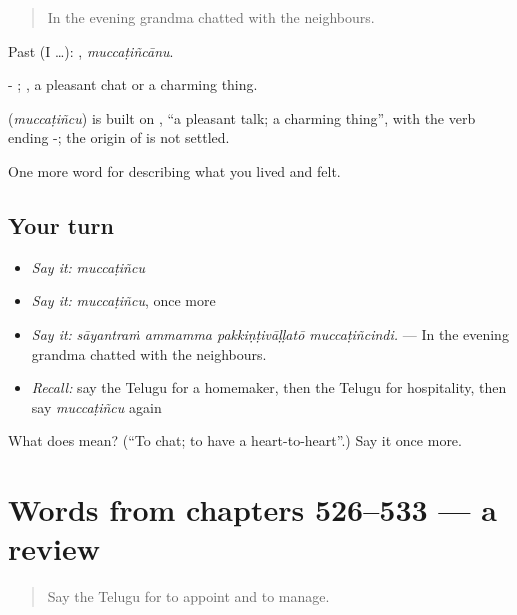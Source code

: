 \begin{quote}
In the evening grandma chatted with the neighbours.
\end{quote}

Past (I …): , \emph{muccaṭiñcānu}.

- ; , a pleasant chat or a charming thing.

\begin{cousinweb}
\textbf{} (\emph{muccaṭiñcu}) is built on , \textquotedblleft{}a pleasant talk; a charming thing\textquotedblright{}, with the verb ending -; the origin of  is not settled.
\end{cousinweb}

\begin{grammarlens}[title={What you've built}]
One more word for describing what you lived and felt.
\end{grammarlens}

\subsection*{Your turn}
\begin{itemize}
\raggedright
  \item \emph{Say it:} \emph{muccaṭiñcu}
  \item \emph{Say it:} \emph{muccaṭiñcu}, once more
  \item \emph{Say it:} \emph{sāyantraṁ ammamma pakkiṇṭivāḷḷatō muccaṭiñcindi.} — In the evening grandma chatted with the neighbours.
  \item \emph{Recall:} say the Telugu for a homemaker, then the Telugu for hospitality, then say \emph{muccaṭiñcu} again
\end{itemize}

\begin{tcolorbox}[breakable,colback=teal!4,colframe=teal!35!black,title={Before you move on}]
What does  mean? (\textquotedblleft{}To chat; to have a heart-to-heart\textquotedblright{}.) Say it once more.
\end{tcolorbox}
\section[(dialogue)]{Words from chapters 526–533 — a review}

\label{lesson:TE-R533-review-526-533}



\begin{quote}
Say the Telugu for to appoint and to manage.
\end{quote}

